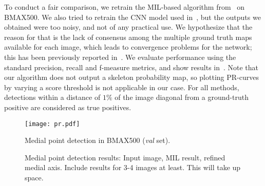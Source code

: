 \documentclass[10pt,twocolumn,letterpaper]{article}
\begin{document}
To conduct a fair comparison, we retrain the MIL-based algorithm from~\cite{tsogkas2012learning} on BMAX500.
We also tried to retrain the CNN model used in~\cite{shen2016object}, but the outputs we obtained were too noisy, 
and not of any practical use.
We hypothesize that the reason for that is the lack of consensus among the multiple ground truth maps
available for each image, which leads to convergence problems for the network; this has been previously
reported in~\cite{xie2015holistically}.
We evaluate performance using the standard precision, recall and f-measure metrics, 
and show results in~.
Note that our algorithm does not output a skeleton probability map, so plotting 
PR-curves by varying a score threshold is not applicable in our case.
For all methods, detections within a distance of $1\%$ of the image diagonal from a ground-truth positive 
are considered as true positives.


\begin{figure}
\centering
\texttt{[image: pr.pdf]}
\caption{Medial point detection in BMAX500 (\emph{val} set).}
\label{fig:experiments:detection:pr}
\end{figure}

\begin{figure}[t]
\centering
\caption{Medial point detection results: Input image, MIL result, refined medial axis. 
Include results for 3-4 images at least. This will take up space.}
\label{fig:experiments:detection:examples}
\end{figure}
\end{document}
